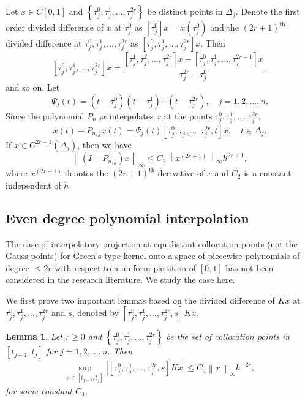 \documentclass[sn-mathphys-num]{sn-jnl}%
\theoremstyle{thmstyleone}%
\theoremstyle{thmstyletwo}%
\theoremstyle{thmstylethree}%
\newcommand{\norm}[1]{\left\lVert #1\right\rVert}
\newtheorem{lemma}{\bf Lemma}[section]
\begin{document}
Let $x \in C[0, 1]$ and $\left\{\tau_j^0, \tau_j^1, \ldots, \tau_j^{2r} \right\}$ be distinct points in $\Delta_{j}$. Denote the first order divided difference of $x$ at $\tau_j^0$ as $\left[\tau_j^0\right]x = x(\tau_j^0)$ and 
the $(2r+1)^{\text{th}}$ divided difference at $\tau_j^0, \tau_j^1, \ldots, \tau_j^{2r}$ as $\left[\tau_j^0, \tau_j^1, \ldots, \tau_j^{2r}\right]{x}$. Then
$$
\left[\tau_j^0, \tau_j^1, \ldots, \tau_j^{2r}\right] x= \frac{\left[\tau_j^1, \tau_j^2, \ldots, \tau_j^{2r}\right] x - \left[\tau_j^0, \tau_j^1, \ldots, \tau_j^{2r-1}\right] x}{\tau_j^{2r}- \tau_j^0},
$$ 
and so on. Let 
$$
\Psi_j(t) = \left(t - \tau_j^0 \right)\left(t - \tau_j^1 \right) \cdots \left(t - \tau_j^{2r} \right), \quad j =1,2, \ldots, n.
$$
Since the polynomial $P_{n,j}x$ interpolates $x$ at the points $\tau_j^0, \tau_j^1, \ldots, \tau_j^{2r}$,
$$
x(t) - P_{n,j}x(t) = \Psi_j(t) \left[\tau_j^0, \tau_j^1, \ldots, \tau_j^{2r}, t  \right]x , \quad t \in \Delta_j.
$$
If $x \in C^{2r+1}(\Delta_{j})$, then we have
\begin{equation} \label{Eq: 5}
	\norm{(I - P_{n,j})x}_\infty \le C_2 \norm{x^{(2r+1)}}_\infty h^{2r+1},
\end{equation}
where $x^{(2r+1)}$ denotes the $(2r+1)^{\text{th}}$ derivative of $x$ and $C_2$ is a constant independent of $h$.

\subsection{Even degree polynomial interpolation}

The case of interpolatory projection at equidistant collocation points (not the Gauss points) for Green's type kernel onto a space of piecewise polynomials of degree $\leq 2r$ with respect to a uniform partition of $[0, 1]$ has not been considered in the research literature. We study the case here.

We first prove two important lemmas based on the divided difference of $Kx$ at $\tau_j^0, \tau_j^1, \ldots, \tau_j^{2r}$ and $s$, denoted by $\left[\tau_j^0, \tau_j^1, \ldots, \tau_j^{2r}, s  \right]Kx$.

\begin{lemma} \label{le1}
	Let $r \ge 0$ and $\left\{\tau_j^0, \tau_j^1, \ldots, \tau_j^{2r} \right\}$ be the set of collocation points in $[t_{j-1}, t_j]$ for $j = 1, 2, \ldots, n$. Then
	\begin{eqnarray*}
		\sup_{s \in [t_{j-1}, t_j]}	\left|\left[\tau_j^0, \tau_j^1, \ldots, \tau_j^{2r}, s  \right]K x\right| \leq C_4 \norm{x}_\infty h^{-2r},
	\end{eqnarray*}
	for some constant $C_4$.
\end{lemma}
\end{document}
